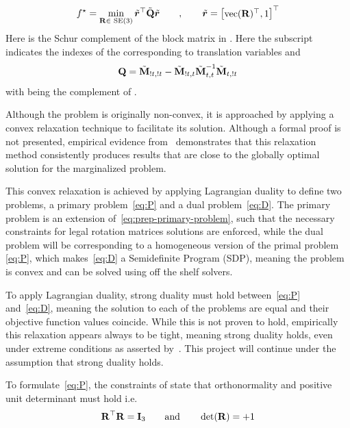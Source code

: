 %
\begin{equation}\label{eq:prep-primary-problem}
	f^\star = \min_{\mat{R}\in \SE (3)} \tilde{\vec{r}}^\T \tilde{\mat{Q}} \tilde{\vec{r}} \qquad, \qquad \tilde{\vec{r}}=\rvec{\text{vec}(\mat{R})^\T, 1}^\T
\end{equation}
Here  is the Schur complement of the block matrix  in . Here the  subscript indicates the indexes of the corresponding to translation variables and
\begin{equation}
	\bm{\mathrm{Q}} = \tilde{\bm{\mathrm{M}}}_{!t,!t} - \tilde{\bm{\mathrm{M}}}_{!t,t}\tilde{\bm{\mathrm{M}}}_{t,t}^{-1} \tilde{\bm{\mathrm{M}}}_{t,!t}
\end{equation}
with  being the complement of .\medskip 

Although the problem is originally non-convex, it is approached by applying a convex relaxation technique to facilitate its solution. Although a formal proof is not presented, empirical evidence from~\cite{convex-global-3d-registration-with-lagrangian-duality} demonstrates that this relaxation method consistently produces results that are close to the globally optimal solution for the marginalized problem. \medskip

This convex relaxation is achieved by applying Lagrangian duality to define two problems, a primary problem~\ref{eq:P} and a dual problem~\ref{eq:D}. The primary problem is an extension of~\eqref{eq:prep-primary-problem}, such that the necessary constraints for legal rotation matrices solutions are enforced, while the dual problem will be corresponding to a homogeneous version of the primal problem \ref{eq:P}, which makes~\ref{eq:D} a Semidefinite Program (SDP), meaning the problem is convex and can be solved using off the shelf solvers. \medskip

To apply Lagrangian duality, strong duality must hold between~\ref{eq:P} and~\ref{eq:D}, meaning the solution to each of the problems are equal and their objective function values coincide. While this is not proven to hold, empirically this relaxation appears always to be tight, meaning strong duality holds, even under extreme conditions as asserted by~\cite{convex-global-3d-registration-with-lagrangian-duality}. This project will continue under the assumption that strong duality holds. \medskip

To formulate~\ref{eq:P}, the constraints of  state that orthonormality and positive unit determinant must hold i.e.
%
\begin{equation}
	\bm{\mathrm{R}}^\top\bm{\mathrm{R}} = \bm{\mathrm{I}}_3 \qquad \text{and} \qquad \det(\bm{\mathrm{R}})=+1
\end{equation}

